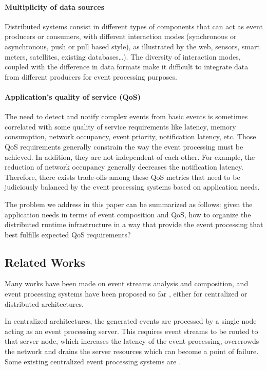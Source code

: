 \documentclass[a4paper,twoside]{article}
\begin{document}
\paragraph{Multiplicity of data sources}
Distributed systems consist in different types of components that can act as event producers or consumers, with different interaction modes (synchronous or asynchronous, push or pull based style), as illustrated by the web, sensors, smart meters, satellites, existing databases…). The diversity of interaction modes, coupled with the difference in data formats make it difficult to integrate data from different producers for event processing purposes.
\paragraph{Application’s quality of service (QoS)}
The need to detect and notify complex events from basic events is sometimes correlated with some quality of service requirements like latency, memory consumption, network occupancy, event priority, notification latency, etc. Those QoS requirements generally constrain the way the event processing must be achieved. In addition, they are not independent of each other. For example, the reduction of network occupancy generally decreases the notification latency. Therefore, there exists trade-offs among these QoS metrics that need to be judiciously balanced by the event processing systems based on application needs.

The problem we address in this paper can be summarized as follows: given the application needs in terms of event composition and QoS, how to organize the distributed runtime infrastructure in a way that provide the event processing that best fulfills expected QoS requirements?
\subsection{Related Works}
Many works have been made on event streams analysis and composition, and event processing systems have been proposed so far \cite{Esper,Streambase,Cugola2009,Gyllstrom2006,Oracle}, either for centralized or distributed architectures. 

In centralized architectures, the generated events are processed by a single node acting as an event processing server. This requires event streams to be routed to that server node, which increases the latency of the event processing, overcrowds the network and drains the server resources which can become a point of failure. Some existing centralized event processing systems are \cite{Esper,Gyllstrom2006,Demers2007,Luckham1996,Oracle}.
\end{document}
